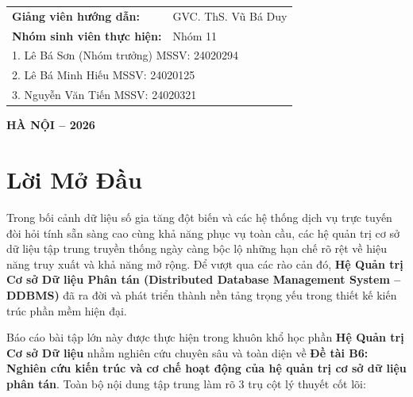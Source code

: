 \documentclass[12pt,a4paper]{report}
\begin{document}
\begin{titlepage}
    \vfill

    \begin{minipage}[t]{0.88\textwidth}
        \fontsize{12pt}{16pt}\selectfont
        \begin{tabular}{ll}
            \textbf{Giảng viên hướng dẫn:} & GVC. ThS. Vũ Bá Duy \\[0.4cm]
            \textbf{Nhóm sinh viên thực hiện:} & Nhóm 11 \\[0.2cm]
            \multicolumn{2}{l}{1. Lê Bá Sơn (Nhóm trưởng) \hfill MSSV: 24020294} \\
            \multicolumn{2}{l}{2. Lê Bá Minh Hiếu \hfill MSSV: 24020125} \\
            \multicolumn{2}{l}{3. Nguyễn Văn Tiến \hfill MSSV: 24020321} \\
        \end{tabular}
    \end{minipage}

    \vspace{1.2cm}

    {\fontsize{12pt}{15pt}\selectfont \textbf{HÀ NỘI -- 2026}\par}
    \vspace*{0.2cm}
\end{titlepage}


\chapter*{Lời Mở Đầu}
\vspace*{-0.5cm}

Trong bối cảnh dữ liệu số gia tăng đột biến và các hệ thống dịch vụ trực tuyến đòi hỏi tính sẵn sàng cao cùng khả năng phục vụ toàn cầu, các hệ quản trị cơ sở dữ liệu tập trung truyền thống ngày càng bộc lộ những hạn chế rõ rệt về hiệu năng truy xuất và khả năng mở rộng. Để vượt qua các rào cản đó, \textbf{Hệ Quản trị Cơ sở Dữ liệu Phân tán (Distributed Database Management System -- DDBMS)} đã ra đời và phát triển thành nền tảng trọng yếu trong thiết kế kiến trúc phần mềm hiện đại.

Báo cáo bài tập lớn này được thực hiện trong khuôn khổ học phần \textbf{Hệ Quản trị Cơ sở Dữ liệu} nhằm nghiên cứu chuyên sâu và toàn diện về \textbf{Đề tài B6: Nghiên cứu kiến trúc và cơ chế hoạt động của hệ quản trị cơ sở dữ liệu phân tán}. Toàn bộ nội dung tập trung làm rõ 3 trụ cột lý thuyết cốt lõi:
\end{document}
